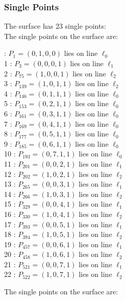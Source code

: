 \documentclass{article}
\begin{document}
{\subsubsection*{Single Points}
The surface has 23 single points:\\
The single points on the surface are:\\
\begin{multicols}{2}
 : $P_{1}=( 0, 1, 0, 0 )$ lies on line $\ell_{0}$\\
1 : $P_{3}=( 0, 0, 0, 1 )$ lies on line $\ell_{1}$\\
2 : $P_{75}=( 1, 0, 0, 1 )$ lies on line $\ell_{2}$\\
3 : $P_{139}=( 1, 0, 1, 1 )$ lies on line $\ell_{2}$\\
4 : $P_{146}=( 0, 1, 1, 1 )$ lies on line $\ell_{0}$\\
5 : $P_{153}=( 0, 2, 1, 1 )$ lies on line $\ell_{0}$\\
6 : $P_{161}=( 0, 3, 1, 1 )$ lies on line $\ell_{0}$\\
7 : $P_{169}=( 0, 4, 1, 1 )$ lies on line $\ell_{0}$\\
8 : $P_{177}=( 0, 5, 1, 1 )$ lies on line $\ell_{0}$\\
9 : $P_{185}=( 0, 6, 1, 1 )$ lies on line $\ell_{0}$\\
10 : $P_{193}=( 0, 7, 1, 1 )$ lies on line $\ell_{0}$\\
11 : $P_{201}=( 0, 0, 2, 1 )$ lies on line $\ell_{1}$\\
12 : $P_{202}=( 1, 0, 2, 1 )$ lies on line $\ell_{2}$\\
13 : $P_{265}=( 0, 0, 3, 1 )$ lies on line $\ell_{1}$\\
14 : $P_{266}=( 1, 0, 3, 1 )$ lies on line $\ell_{2}$\\
15 : $P_{329}=( 0, 0, 4, 1 )$ lies on line $\ell_{1}$\\
16 : $P_{330}=( 1, 0, 4, 1 )$ lies on line $\ell_{2}$\\
17 : $P_{393}=( 0, 0, 5, 1 )$ lies on line $\ell_{1}$\\
18 : $P_{394}=( 1, 0, 5, 1 )$ lies on line $\ell_{2}$\\
19 : $P_{457}=( 0, 0, 6, 1 )$ lies on line $\ell_{1}$\\
20 : $P_{458}=( 1, 0, 6, 1 )$ lies on line $\ell_{2}$\\
21 : $P_{521}=( 0, 0, 7, 1 )$ lies on line $\ell_{1}$\\
22 : $P_{522}=( 1, 0, 7, 1 )$ lies on line $\ell_{2}$\\
\end{multicols}
The single points on the surface are:\\
}
\end{document}
